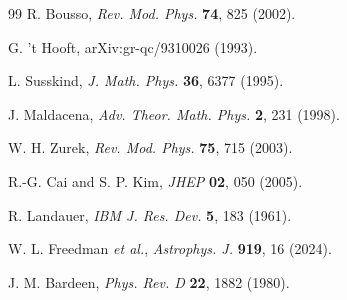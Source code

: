 \documentclass[twocolumn,superscriptaddress,prl,amsmath,amssymb]{revtex4-2}
\begin{document}
\begin{thebibliography}{99}
R. Bousso,
\textit{Rev. Mod. Phys.} \textbf{74}, 825 (2002).

G. 't Hooft,
arXiv:gr-qc/9310026 (1993).

L. Susskind,
\textit{J. Math. Phys.} \textbf{36}, 6377 (1995).

J. Maldacena,
\textit{Adv. Theor. Math. Phys.} \textbf{2}, 231 (1998).

W. H. Zurek,
\textit{Rev. Mod. Phys.} \textbf{75}, 715 (2003).

R.-G. Cai and S. P. Kim,
\textit{JHEP} \textbf{02}, 050 (2005).

R. Landauer,
\textit{IBM J. Res. Dev.} \textbf{5}, 183 (1961).

W. L. Freedman \textit{et al.},
\textit{Astrophys. J.} \textbf{919}, 16 (2024).

J. M. Bardeen,
\textit{Phys. Rev. D} \textbf{22}, 1882 (1980).

\end{thebibliography}
\end{document}
